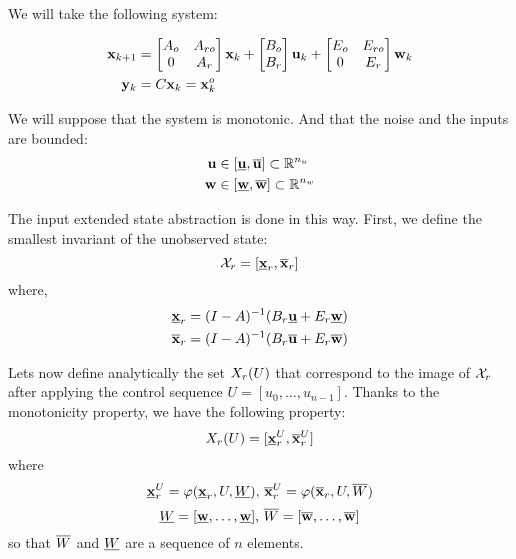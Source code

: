 We will take the following system:

\begin{equation}
\begin{aligned}
 \mathbf{x}_{k+1} &=
\begin{bmatrix} A_o&A_{ro}\\ 0& A_r \end{bmatrix}  \mathbf{x}_{k} + 
\begin{bmatrix} B_o\\ B_r \end{bmatrix}  \mathbf{u}_{k} + 
\begin{bmatrix} E_o & E_{ro} \\ 0 & E_r \end{bmatrix}  \mathbf{w}_{k}
\\
 \mathbf{y}_{k} &= C \mathbf{x}_{k} =  \mathbf{x}^o_k
\end{aligned}
\end{equation}

We will suppose that the system is monotonic. 
And that the noise and the inputs are bounded:
\begin{equation}
\begin{aligned}
 \mathbf{u} &\in [\underline{ \mathbf{u}},\overline{ \mathbf{u}}] \subset \mathbb{R}^{n_u}\\
 \mathbf{w} &\in [\underline{ \mathbf{w}},\overline{ \mathbf{w}}] \subset \mathbb{R}^{n_w}\\
\end{aligned}
\end{equation}

The input extended state abstraction is done in this way. First, we define the smallest invariant of the unobserved state:
$$
\mathcal{X}_r = [\underline{ \mathbf{x}}_r,\overline{ \mathbf{x}}_r]
$$
where,
$$
\begin{aligned}
\underline{ \mathbf{x}}_r &= (I-A)^{-1} (B_r \underline{ \mathbf{u}} + E_r \underline{ \mathbf{w}})\\
\overline{ \mathbf{x}}_r &= (I-A)^{-1} (B_r \overline{ \mathbf{u}} + E_r \overline{ \mathbf{w}})
\end{aligned}
$$

Lets now define analytically the set $X_r(U)$ that correspond to the image of $\mathcal{X}_r$ after applying the control sequence $U = [u_0,\dots,u_{n-1}]$.
Thanks to the monotonicity property, we have the following property:
\newcommand{\xui}{\minf{\x}^U_r}
\newcommand{\xus}{\msup{\x}^U_r}
\newcommand{\xu}{\x^U_r}
$$\Xr(U) = [\xui,\xus]$$
where
$$\xui = \traj (\xrinf,U,\Winf)
\textrm{, }
\xus = \traj (\xrsup,U,\Wsup)$$
$$ \underline{W} = [\underline{ \mathbf{w}},\dots,\underline{ \mathbf{w}}]
\textrm{, }
\overline{W} = [\overline{ \mathbf{w}},\dots,\overline{ \mathbf{w}}]$$
so that $\overline{W}$ and $\underline{W}$ are a sequence of $n$ elements.


